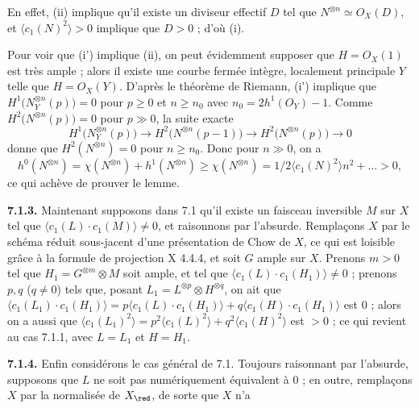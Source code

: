 
En
effet, (ii) implique qu'il existe un diviseur effectif $D$ tel que $N^{\otimes n}\simeq{O}_X(D)$, et $\langle c_1(N)^2\rangle>0$ implique que $D>0$ ; d'o\`u (i).

Pour voir que (i') implique (ii), on peut \'evidemment supposer que $H={O}_X(1)$ est tr\`es ample ; alors il existe une courbe ferm\'ee int\`egre, localement principale $Y$ telle que $H={O}_X(Y)$. D'apr\`es le th\'eor\`eme de Riemann, (i') implique que $H^1\bigl(N_Y^{\otimes n}(p)\bigr)=0$ pour $p\geq0$ et $n\geq n_0$ avec $n_0=2h^1({O}_Y)-1$. Comme $H^2\bigl(N^{\otimes n}(p)\bigr)=0$ pour $p\gg0$, la suite exacte
\[
   H^1\bigl(N_Y^{\otimes n}(p)\bigr)
   \longrightarrow H^2\bigl(N^{\otimes n}(p-1)\bigr)
   \longrightarrow H^2\bigl(N^{\otimes n}(p)\bigr)
   \longrightarrow0
\]
donne que $H^2(N^{\otimes n})=0$ pour $n\geq n_0$. Donc pour $n\gg0$, on a
\[
   h^0(N^{\otimes n})
   =\chi(N^{\otimes n})+h^1(N^{\otimes n})
   \geq\chi(N^{\otimes n})
   =1/2\langle c_1(N)^2\rangle n^2+\ldots>0,
\]
ce qui ach\`eve de prouver le lemme.

\textbf{7.1.3.} Maintenant supposons dans 7.1 qu'il existe un faisceau inversible $M$ sur $X$ tel que $\langle c_1(L)\cdot c_1(M)\rangle\ne0$, et raisonnons par l'absurde. Rempla\c{c}ons $X$ par le sch\'ema r\'eduit sous-jacent d'une pr\'esentation de Chow de $X$, ce qui est loisible gr\^ace \`a la formule de projection X 4.4.4, et soit $G$ ample sur $X$. Prenons $m>0$ tel que $H_1=G^{\otimes m}\otimes M$ soit ample, et tel que $\langle c_1(L)\cdot c_1(H_1)\rangle\ne0$ ; prenons $p,q$ ($q\ne0$) tels que, posant $L_1=L^{\otimes p}\otimes H^{\otimes q}$, on ait que $\langle c_1(L_1)\cdot c_1(H_1)\rangle=p\langle c_1(L)\cdot c_1(H_1)\rangle+q\langle c_1(H)\cdot c_1(H_1)\rangle$ est $0$ ; alors on a aussi que $\langle c_1(L_1)^2\rangle=p^2\langle c_1(L)^2\rangle+q^2\langle c_1(H)^2\rangle$ est $>0$ ; ce qui revient au cas 7.1.1, avec $L=L_1$ et $H=H_1$.

\textbf{7.1.4.} Enfin consid\'erons le cas g\'en\'eral de 7.1. Toujours raisonnant par l'absurde, supposons que $L$ ne soit pas num\'eriquement \'equivalent \`a $0$ ; en outre, rempla\c{c}ons $X$ par la normalis\'ee de $X_{\red}$, de sorte que $X$ n'a 
